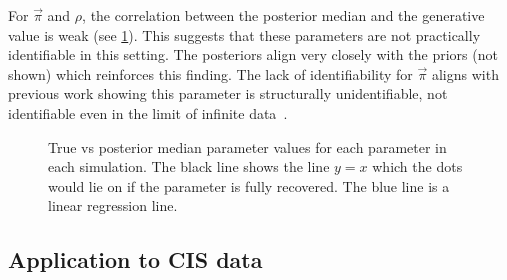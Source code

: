 \documentclass[thesis.tex]{subfiles}
\begin{document}
For $\vec{\pi}$ and $\rho$, the correlation between the posterior median and the generative value is weak (see \cref{SEIR:fig:true-vs-posterior}).
This suggests that these parameters are not practically identifiable in this setting.
The posteriors align very closely with the priors (not shown) which reinforces this finding.
The lack of identifiability for $\vec{\pi}$ aligns with previous work showing this parameter is structurally unidentifiable, \ie not identifiable even in the limit of infinite data~\autocite{dankwaStructural}.
\begin{figure}
    \caption[True vs posterior parameter values]{%
        True vs posterior median parameter values for each parameter in each simulation.
        The black line shows the line $y = x$ which the dots would lie on if the parameter is fully recovered.
        The blue line is a linear regression line.
    }
    \label{SEIR:fig:true-vs-posterior}
\end{figure}

\subsection{Application to CIS data} \label{SEIR:sec:application}
\end{document}
